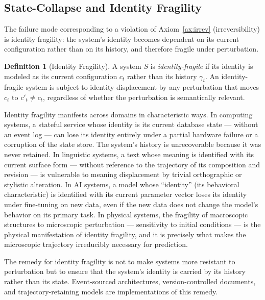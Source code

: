 \documentclass[12pt, twoside]{article}
\theoremstyle{plain}
\theoremstyle{definition}
\newtheorem{definition}[theorem]{Definition}
\theoremstyle{remark}
\begin{document}
\subsection{State-Collapse and Identity Fragility}

The failure mode corresponding to a violation of
Axiom~\ref{ax:irrev} (irreversibility) is identity fragility:
the system's identity becomes dependent on its current configuration
rather than on its history, and therefore fragile under perturbation.

\begin{definition}[Identity Fragility]
A system $S$ is \emph{identity-fragile} if its identity is modeled
as its current configuration $c_t$ rather than its history $\gamma_t$.
An identity-fragile system is subject to identity displacement
by any perturbation that moves $c_t$ to $c'_t \neq c_t$,
regardless of whether the perturbation is semantically relevant.
\end{definition}

Identity fragility manifests across domains in characteristic ways.
In computing systems, a stateful service whose identity is its
current database state — without an event log — can lose its identity
entirely under a partial hardware failure or a corruption of the
state store.
The system's history is unrecoverable because it was never retained.
In linguistic systems, a text whose meaning is identified with
its current surface form — without reference to the trajectory
of its composition and revision — is vulnerable to meaning
displacement by trivial orthographic or stylistic alteration.
In AI systems, a model whose ``identity'' (its behavioral
characteristic) is identified with its current parameter vector
loses its identity under fine-tuning on new data, even if
the new data does not change the model's behavior on its
primary task.
In physical systems, the fragility of macroscopic structures
to microscopic perturbation — sensitivity to initial conditions —
is the physical manifestation of identity fragility,
and it is precisely what makes the microscopic trajectory
irreducibly necessary for prediction.

The remedy for identity fragility is not to make systems more
resistant to perturbation but to ensure that the system's
identity is carried by its history rather than its state.
Event-sourced architectures, version-controlled documents,
and trajectory-retaining models are implementations of this remedy.
\end{document}
